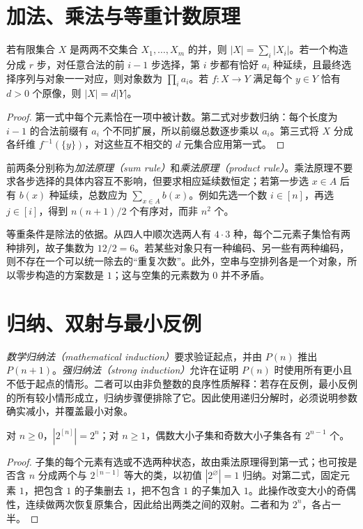 \section{加法、乘法与等重计数原理}

\begin{theorem}[基本计数原理]
若有限集合 $X$ 是两两不交集合 $X_1,\ldots,X_m$ 的并，则 $|X|=\sum_i|X_i|$。若一个构造分成 $r$ 步，对任意合法的前 $i-1$ 步选择，第 $i$ 步都有恰好 $a_i$ 种延续，且最终选择序列与对象一一对应，则对象数为 $\prod_i a_i$。若 $f:X\to Y$ 满足每个 $y\in Y$ 恰有 $d>0$ 个原像，则 $|X|=d|Y|$。
\end{theorem}
\begin{proof}
第一式中每个元素恰在一项中被计数。第二式对步数归纳：每个长度为 $i-1$ 的合法前缀有 $a_i$ 个不同扩展，所以前缀总数逐步乘以 $a_i$。第三式将 $X$ 分成各纤维 $f^{-1}(\{y\})$，对这些互不相交的 $d$ 元集合应用第一式。
\end{proof}

前两条分别称为\emph{加法原理（sum rule）}和\emph{乘法原理（product rule）}。乘法原理不要求各步选择的具体内容互不影响，但要求相应延续数恒定；若第一步选 $x\in A$ 后有 $b(x)$ 种延续，总数应为 $\sum_{x\in A}b(x)$。例如先选一个数 $i\in[n]$，再选 $j\in[i]$，得到 $n(n+1)/2$ 个有序对，而非 $n^2$ 个。

等重条件是除法的依据。从四人中顺次选两人有 $4\cdot3$ 种，每个二元素子集恰有两种排列，故子集数为 $12/2=6$。若某些对象只有一种编码、另一些有两种编码，则不存在一个可以统一除去的“重复次数”。此外，空串与空排列各是一个对象，所以零步构造的方案数是 $1$；这与空集的元素数为 $0$ 并不矛盾。

\section{归纳、双射与最小反例}

\emph{数学归纳法（mathematical induction）}要求验证起点，并由 $P(n)$ 推出 $P(n+1)$。\emph{强归纳法（strong induction）}允许在证明 $P(n)$ 时使用所有更小且不低于起点的情形。二者可以由非负整数的良序性质解释：若存在反例，最小反例的所有较小情形成立，归纳步骤便排除了它。因此使用递归分解时，必须说明参数确实减小，并覆盖最小对象。

\begin{proposition}
对 $n\ge0$，$|2^{[n]}|=2^n$；对 $n\ge1$，偶数大小子集和奇数大小子集各有 $2^{n-1}$ 个。
\end{proposition}
\begin{proof}
子集的每个元素有选或不选两种状态，故由乘法原理得到第一式；也可按是否含 $n$ 分成两个与 $2^{[n-1]}$ 等大的类，以初值 $|2^{\varnothing}|=1$ 归纳。对第二式，固定元素 $1$，把包含 $1$ 的子集删去 $1$，把不包含 $1$ 的子集加入 $1$。此操作改变大小的奇偶性，连续做两次恢复原集合，因此给出两类之间的双射。二者和为 $2^n$，各占一半。
\end{proof}

